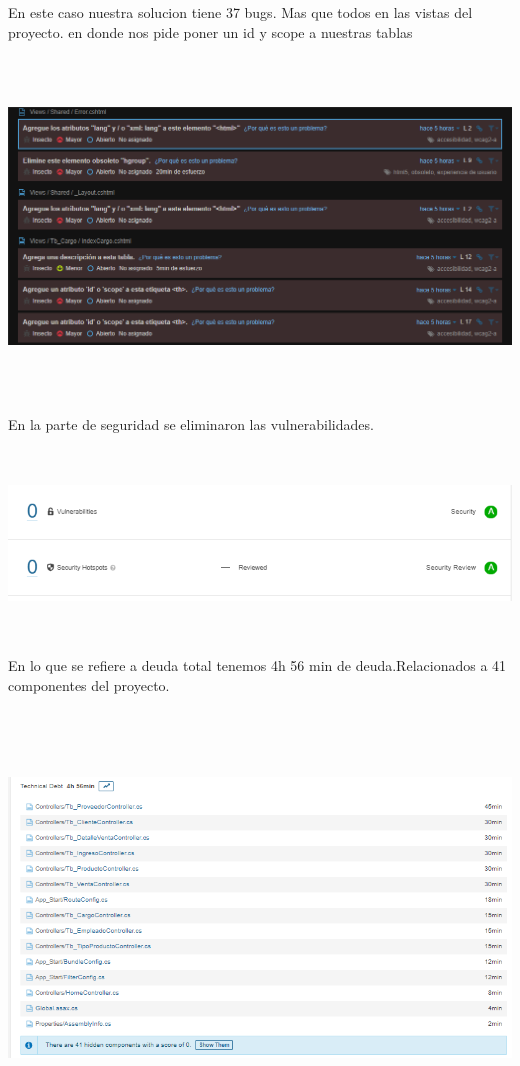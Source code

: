 \documentclass[12pt,letterpaper]{article}
\begin{document}
En este caso nuestra solucion tiene 37 bugs. Mas que todos en las vistas del proyecto.
en donde nos pide poner un id y scope a nuestras tablas
\begin{center}
    \includegraphics[width=18cm, height=9cm]{img/2scan2.png}  
\end{center}
\newpage
En la parte de seguridad se eliminaron las vulnerabilidades.
\begin{center}
    \includegraphics[width=18cm, height=5cm]{img/2scan3.png}  
\end{center}  
\newpage
En lo que se refiere a deuda total tenemos 4h 56 min de deuda.Relacionados a
 41 componentes del proyecto.

\begin{center}
    \includegraphics[width=18cm, height=11cm]{img/2scan4.png}  
\end{center}
\end{document}
